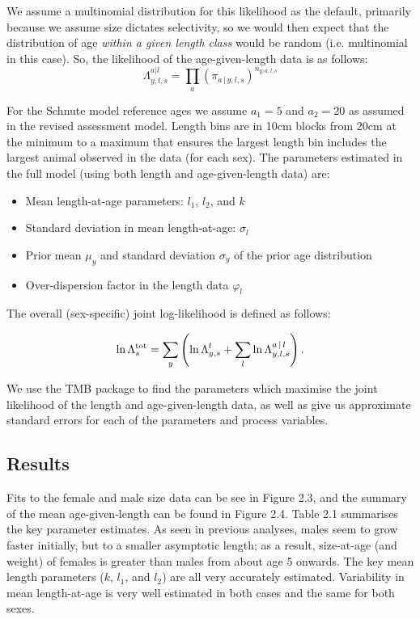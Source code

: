 \documentclass[12pt,a4paper,twoside,times,blue,standard]{csiroreport2017}
\newcommand{\ds}{\displaystyle}
\newcommand{\vphi}{\varphi}
\begin{document}
We assume a multinomial distribution for this likelihood as the default, primarily because we assume size dictates selectivity, so we would then expect that the distribution of age \emph{within a given length class} would be random (i.e. multinomial in this case). So, the likelihood of the age-given-length data is as follows:
\begin{equation*}
    \ds \Lambda^{a|l}_{y,l,s}=\prod_a \left(\pi_{a\,|\,y,l,s}\right)^{n_{y,a,l,s}}
\end{equation*}

For the Schnute model reference ages we assume $a_1=5$ and $a_2=20$ as assumed in the revised assessment model. Length bins are in 10cm blocks from 20cm at the minimum to a maximum that ensures the largest length bin includes the largest animal observed in the data (for each sex). The parameters estimated in the full model (using both length and age-given-length data) are:

\begin{itemize}
    \item Mean length-at-age parameters: $l_1$, $l_2$, and $k$
    \item Standard deviation in mean length-at-age: $\sigma_l$
    \item Prior mean $\mu_y$ and standard deviation $\sigma_y$ of the prior age distribution
    \item Over-dispersion factor in the length data $\vphi_l$
\end{itemize} 

The overall (sex-specific) joint log-likelihood is defined as follows:

\begin{equation*}
    \ds \ln\Lambda^{\rm tot}_s=\sum_y\left(\ln\Lambda^l_{y,s}+\sum_l\ln\Lambda^{a\,|\,l}_{y,l,s}\right).
\end{equation*}

We use the TMB package \cite{tmb} to find the parameters which maximise the joint likelihood of the length and age-given-length data, as well as give us approximate standard errors for each of the parameters and process variables.

\subsection{Results}

Fits to the female and male size data can be see in Figure 2.3, and the summary of the mean age-given-length can be found in Figure 2.4. Table 2.1 summarises the key parameter estimates. As seen in previous analyses, males seem to grow faster initially, but to a smaller asymptotic length; as a result, size-at-age (and weight) of females is greater than males from about age 5 onwards. The key mean length parameters ($k$, $l_1$, and $l_2$) are all very accurately estimated. Variability in mean length-at-age is very well estimated in both cases and the same for both sexes. 
\end{document}
